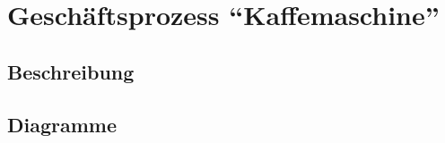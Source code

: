 \chapter{Geschäftsprozess ``Kaffemaschine''}\label{ch:business-process}
\section{Beschreibung}\label{sec:beschreibung}
\section{Diagramme}\label{sec:diagramme}
